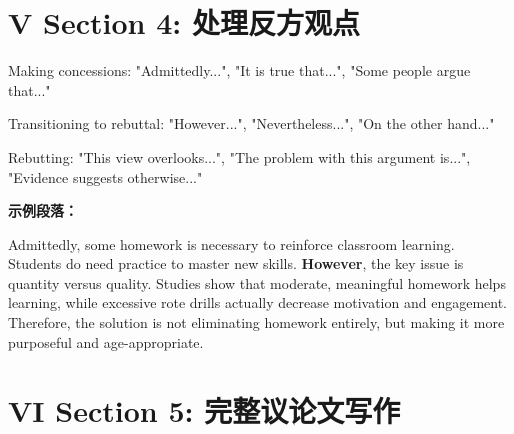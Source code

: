 \documentclass[12pt]{ctexart}
\begin{document}
\section*{V Section 4: 处理反方观点}

\begin{writingscaffold}
  
  \usefulphrasestart
    \item Making concessions: "Admittedly...", "It is true that...", "Some people argue that..."
    \item Transitioning to rebuttal: "However...", "Nevertheless...", "On the other hand..."
    \item Rebutting: "This view overlooks...", "The problem with this argument is...", "Evidence suggests otherwise..."
  \endusefulphrasestart
  
  \modelparagraph
    \textbf{示例段落：}
    
    Admittedly, some homework is necessary to reinforce classroom learning.  Students do need practice to master new skills.  \textbf{However}, the key issue is quantity versus quality.  Studies show that moderate, meaningful homework helps learning, while excessive rote drills actually decrease motivation and engagement.  Therefore, the solution is not eliminating homework entirely, but making it more purposeful and age-appropriate.
  \endmodelparagraph
  
  \begin{exercises}
    \ansspace[6cm]
    
    \yourentyparagraph{\ansspace[12cm]}
  \end{exercises}
  
\end{writingscaffold}

\section*{VI Section 5: 完整议论文写作}
\end{document}
